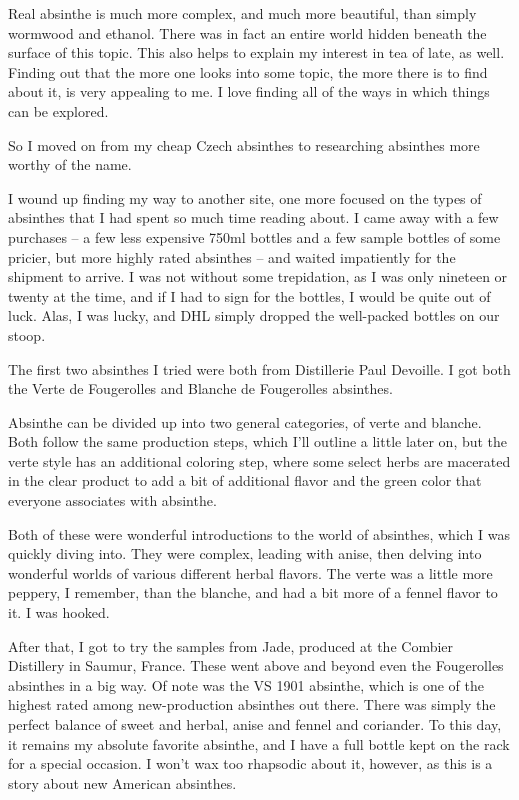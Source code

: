 \documentclass[12pt,letterpaper,oneside]{memoir}
\begin{document}
  Real absinthe is much more complex, and much more beautiful, than simply wormwood and ethanol.  There was in fact an entire world hidden beneath the surface of this topic.  This also helps to explain my interest in tea of late, as well.  Finding out that the more one looks into some topic, the more there is to find about it, is very appealing to me.  I love finding all of the ways in which things can be explored.

  So I moved on from my cheap Czech absinthes to researching absinthes more worthy of the name.

  I wound up finding my way to another site, one more focused on the types of absinthes that I had spent so much time reading about.  I came away with a few purchases -- a few less expensive 750ml bottles and a few sample bottles of some pricier, but more highly rated absinthes -- and waited impatiently for the shipment to arrive.  I was not without some trepidation, as I was only nineteen or twenty at the time, and if I had to sign for the bottles, I would be quite out of luck.  Alas, I was lucky, and DHL simply dropped the well-packed bottles on our stoop.

  The first two absinthes I tried were both from Distillerie Paul Devoille.  I got both the Verte de Fougerolles and Blanche de Fougerolles absinthes.

  Absinthe can be divided up into two general categories, of verte and blanche.  Both follow the same production steps, which I'll outline a little later on, but the verte style has an additional coloring step, where some select herbs are macerated in the clear product to add a bit of additional flavor and the green color that everyone associates with absinthe.

  Both of these were wonderful introductions to the world of absinthes, which I was quickly diving into.  They were complex, leading with anise, then delving into wonderful worlds of various different herbal flavors.  The verte was a little more peppery, I remember, than the blanche, and had a bit more of a fennel flavor to it.  I was hooked.

  After that, I got to try the samples from Jade, produced at the Combier Distillery in Saumur, France.  These went above and beyond even the Fougerolles absinthes in a big way.  Of note was the VS 1901 absinthe, which is one of the highest rated among new-production absinthes out there.  There was simply the perfect balance of sweet and herbal, anise and fennel and coriander.  To this day, it remains my absolute favorite absinthe, and I have a full bottle kept on the rack for a special occasion.  I won't wax too rhapsodic about it, however, as this is a story about new American absinthes.
\end{document}
